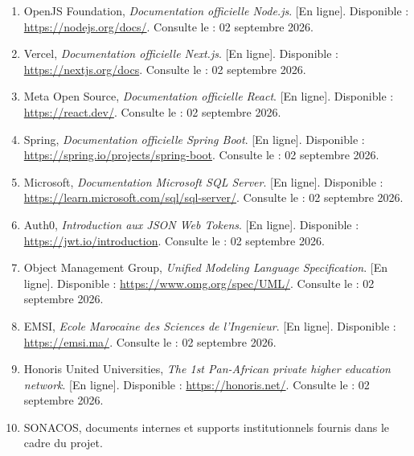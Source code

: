 \documentclass[12pt,a4paper]{report}
\begin{document}
\begin{enumerate}
  \item OpenJS Foundation, \textit{Documentation officielle Node.js}. [En ligne]. Disponible : \url{https://nodejs.org/docs/}. Consulte le : 02 septembre 2026.
  \item Vercel, \textit{Documentation officielle Next.js}. [En ligne]. Disponible : \url{https://nextjs.org/docs}. Consulte le : 02 septembre 2026.
  \item Meta Open Source, \textit{Documentation officielle React}. [En ligne]. Disponible : \url{https://react.dev/}. Consulte le : 02 septembre 2026.
  \item Spring, \textit{Documentation officielle Spring Boot}. [En ligne]. Disponible : \url{https://spring.io/projects/spring-boot}. Consulte le : 02 septembre 2026.
  \item Microsoft, \textit{Documentation Microsoft SQL Server}. [En ligne]. Disponible : \url{https://learn.microsoft.com/sql/sql-server/}. Consulte le : 02 septembre 2026.
  \item Auth0, \textit{Introduction aux JSON Web Tokens}. [En ligne]. Disponible : \url{https://jwt.io/introduction}. Consulte le : 02 septembre 2026.
  \item Object Management Group, \textit{Unified Modeling Language Specification}. [En ligne]. Disponible : \url{https://www.omg.org/spec/UML/}. Consulte le : 02 septembre 2026.
  \item EMSI, \textit{Ecole Marocaine des Sciences de l'Ingenieur}. [En ligne]. Disponible : \url{https://emsi.ma/}. Consulte le : 02 septembre 2026.
  \item Honoris United Universities, \textit{The 1st Pan-African private higher education network}. [En ligne]. Disponible : \url{https://honoris.net/}. Consulte le : 02 septembre 2026.
  \item SONACOS, documents internes et supports institutionnels fournis dans le cadre du projet.
\end{enumerate}
\end{document}
